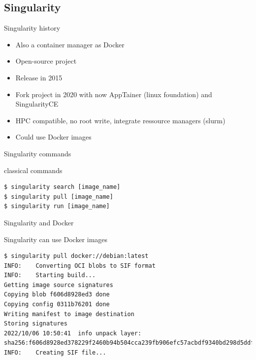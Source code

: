 \subsection{Singularity}
\begin{frame}[<+->]{Singularity history}
\begin{itemize}
\item Also a container manager as Docker
\item Open-source project
\item Release in 2015
\item Fork project in 2020 with now AppTainer (linux foundation) and SingularityCE
\item HPC compatible, no root write, integrate ressource managers (slurm)
\item Could use Docker images
\end{itemize}
\end{frame}

\begin{frame}[<+->][fragile]{Singularity commands}
\begin{block}{classical commands}
\begin{verbatim}
$ singularity search [image_name]
$ singularity pull [image_name]
$ singularity run [image_name]
\end{verbatim}
\end{block}
\end{frame}

\begin{frame}[<+->][fragile]{Singularity and Docker}
\begin{block}{Singularity can use Docker images}
\begin{verbatim}
$ singularity pull docker://debian:latest
INFO:    Converting OCI blobs to SIF format
INFO:    Starting build...
Getting image source signatures
Copying blob f606d8928ed3 done  
Copying config 0311b76201 done  
Writing manifest to image destination
Storing signatures
2022/10/06 10:50:41  info unpack layer: sha256:f606d8928ed378229f2460b94b504cca239fb906efc57acbdf9340bd298d5ddf
INFO:    Creating SIF file...
\end{verbatim}
\end{block}
\end{frame}
